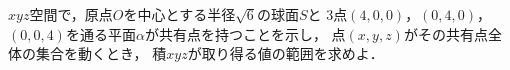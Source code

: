\documentclass[../../main.tex]{subfiles}
\begin{document}
$xyz$空間で，原点$O$を中心とする半径$\sqrt6$の球面$S$と
3点$(4,0,0)$，$(0,4,0)$，$(0,0,4)$を通る平面$\alpha$が共有点を持つことを示し，
点$(x,y,z)$がその共有点全体の集合を動くとき，
積$xyz$が取り得る値の範囲を求めよ．
\end{document}
